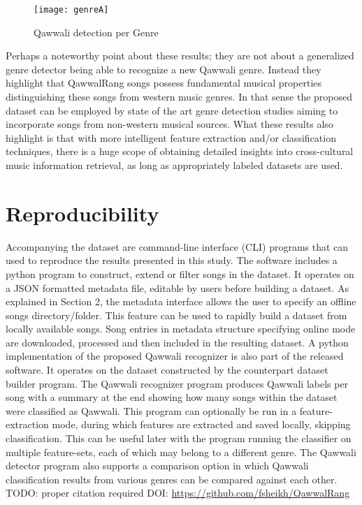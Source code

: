 \documentclass{article}
\begin{document}
\begin{figure}[htbp]
  \centering
  \texttt{[image: genreA]}
  \caption{Qawwali detection per Genre}
\label{fig:src_genre}
\end{figure}

Perhaps a noteworthy point about these results; they are not about a generalized genre detector being able to recognize a new Qawwali genre. Instead they highlight that QawwalRang songs possess fundamental musical properties distinguishing these songs from western music genres. In that sense the proposed dataset can be employed by state of the art genre detection studies aiming to incorporate songs from non-western musical sources. What these results also highlight is that with more intelligent feature extraction and/or classification techniques, there is a huge scope of obtaining detailed insights into cross-cultural music information retrieval, as long as appropriately labeled datasets are used. 

\section{Reproducibility}
Accompanying the dataset are command-line interface (CLI) programs that can used to reproduce the results presented in this study. The software includes a python program to construct, extend or filter songs in the dataset. It operates on a JSON \citep{json} formatted metadata file, editable by users before building a dataset. As explained in Section 2, the metadata interface allows the user to specify an offline songs directory/folder. This feature can be used to rapidly build a dataset from locally available songs. Song entries in metadata structure specifying online mode are downloaded, processed and then included in the resulting dataset. A python implementation of the proposed Qawwali recognizer is also part of the released software. It operates on the dataset constructed by the counterpart dataset builder program. The Qawwali recognizer program produces Qawwali labels per song with a summary at the end showing how many songs within the dataset were classified as Qawwali. This program can optionally be run in a feature-extraction mode, during which features are extracted and saved locally, skipping classification. This can be useful later with the program running the classifier on multiple feature-sets,  each of which may belong to a different genre. The Qawwali detector program also supports a comparison option in which Qawwali classification results from various genres can be compared against each other. TODO: proper citation required DOI: \url{https://github.com/fsheikh/QawwalRang} 
\end{document}
